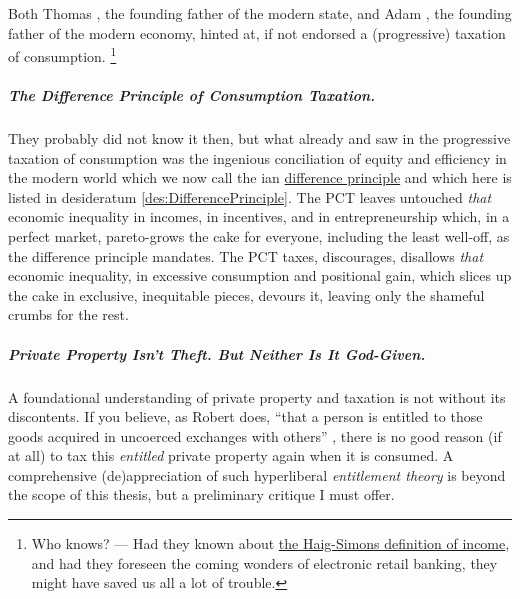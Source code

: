 Both Thomas \citeauthor{Hobbes-1651-aa}, the founding father of the modern state, and Adam \citeauthor{Smith-1776-lq}, the founding father of the modern economy, hinted at, if not endorsed a (progressive) taxation of consumption.
\footnote{
	Who knows?
	--- Had they known about \hyperref[eq:HaigSimonsPCT]{the Haig-Simons definition of income}, and had they foreseen the coming wonders of electronic retail banking, they might have saved us all a lot of trouble.
}

\subparagraph{The Difference Principle of Consumption Taxation.}
They probably did not know it then, but what already \citeauthor{Hobbes-1651-aa} and \citeauthor{Smith-1776-lq} saw in the progressive taxation of consumption was the ingenious conciliation of equity and efficiency in the modern world which we now call the \citeauthor{Rawls-1971}ian \hyperref[des:DifferencePrinciple]{difference principle} and which here is listed in desideratum \ref{des:DifferencePrinciple}.
The PCT leaves untouched \emph{that} economic inequality in incomes, in incentives, and in entrepreneurship which, in a perfect market, pareto-grows the cake for everyone, including the least well-off, as the difference principle mandates.
The PCT taxes, discourages, disallows \emph{that} economic inequality, in excessive consumption and positional gain, which slices up the cake in exclusive, inequitable pieces, devours it, leaving only the shameful crumbs for the rest.

\subparagraph{Private Property Isn't Theft. But Neither Is It God-Given.}
	\label{sec:AntiEntitlement}
A foundational understanding of private property and taxation is not without its discontents.
If you believe, as Robert \citeauthor{Nozick1974} does, ``that a person is entitled to those goods acquired in uncoerced exchanges with others'' \citeyearpar[149]{Nozick1974}, there is no good reason (if at all) to tax this \emph{entitled} private property again when it is consumed.
A comprehensive (de)appreciation of such hyperliberal \emph{entitlement theory} is beyond the scope of this thesis, but a preliminary critique I must offer.

